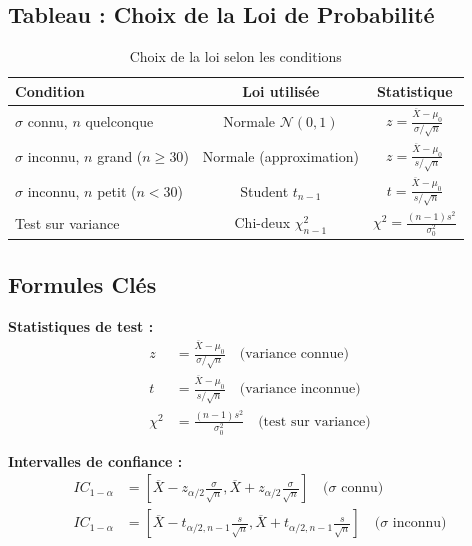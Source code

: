 \documentclass[11pt,a4paper]{article}
\begin{document}
\subsection{Tableau : Choix de la Loi de Probabilité}

\begin{table}[h]
\centering
\small
\begin{tabular}{|l|c|c|}
\hline
\textbf{Condition} & \textbf{Loi utilisée} & \textbf{Statistique} \\
\hline
$\sigma$ connu, $n$ quelconque & Normale $\mathcal{N}(0,1)$ & $z = \frac{\overline{X} - \mu_0}{\sigma/\sqrt{n}}$ \\
\hline
$\sigma$ inconnu, $n$ grand ($n \geq 30$) & Normale (approximation) & $z = \frac{\overline{X} - \mu_0}{s/\sqrt{n}}$ \\
\hline
$\sigma$ inconnu, $n$ petit ($n < 30$) & Student $t_{n-1}$ & $t = \frac{\overline{X} - \mu_0}{s/\sqrt{n}}$ \\
\hline
Test sur variance & Chi-deux $\chi^2_{n-1}$ & $\chi^2 = \frac{(n-1)s^2}{\sigma_0^2}$ \\
\hline
\end{tabular}
\caption{Choix de la loi selon les conditions}
\end{table}

\subsection{Formules Clés}

\begin{rappelbox}
\textbf{Statistiques de test :}
\begin{align}
z &= \frac{\overline{X} - \mu_0}{\sigma/\sqrt{n}} \quad \text{(variance connue)} \\
t &= \frac{\overline{X} - \mu_0}{s/\sqrt{n}} \quad \text{(variance inconnue)} \\
\chi^2 &= \frac{(n-1)s^2}{\sigma_0^2} \quad \text{(test sur variance)}
\end{align}

\textbf{Intervalles de confiance :}
\begin{align}
IC_{1-\alpha} &= \left[\overline{X} - z_{\alpha/2} \frac{\sigma}{\sqrt{n}}, \overline{X} + z_{\alpha/2} \frac{\sigma}{\sqrt{n}}\right] \quad \text{($\sigma$ connu)} \\
IC_{1-\alpha} &= \left[\overline{X} - t_{\alpha/2, n-1} \frac{s}{\sqrt{n}}, \overline{X} + t_{\alpha/2, n-1} \frac{s}{\sqrt{n}}\right] \quad \text{($\sigma$ inconnu)}
\end{align}
\end{rappelbox}
\end{document}

